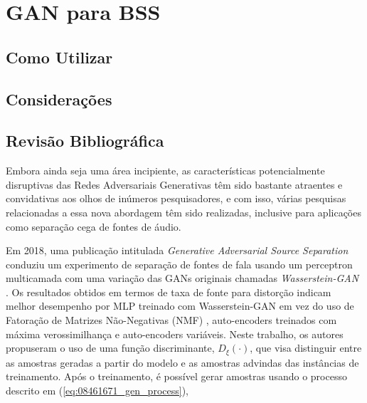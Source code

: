 \chapter{GAN para BSS}
\label{cha:gan_for_bss}





\section{Como Utilizar}
\label{sec:gan_for_bss_how_to_use}



\section{Considerações}
\label{sec:sec:gan_for_bss_considerations}



\section{Revisão Bibliográfica}
\label{sec:gan_for_bss_bib_review}

Embora ainda seja uma área incipiente, as características potencialmente disruptivas das Redes Adversariais Generativas têm sido bastante atraentes e convidativas aos olhos de inúmeros pesquisadores, e com isso, várias pesquisas relacionadas a essa nova abordagem têm sido realizadas, inclusive para aplicações como separação cega de fontes de áudio.

Em 2018, uma publicação intitulada \textit{Generative Adversarial Source Separation} \citep{8461671} conduziu um experimento de separação de fontes de fala usando um perceptron multicamada com uma variação das GANs originais chamadas \textit{Wasserstein-GAN} \citep{arjovsky2017wasserstein}. Os resultados obtidos em termos de taxa de fonte para distorção indicam melhor desempenho por MLP treinado com Wasserstein-GAN em vez do uso de Fatoração de Matrizes Não-Negativas (NMF) \citep{lee1999learning}, auto-encoders treinados com máxima verossimilhança e auto-encoders variáveis. Neste trabalho, os autores propuseram o uso de uma função discriminante, $D_{\xi}\left(\cdot\right)$, que visa distinguir entre as amostras geradas a partir do modelo e as amostras advindas das instâncias de treinamento. Após o treinamento, é possível gerar amostras usando o processo descrito em (\ref{eq:08461671_gen_process}),

